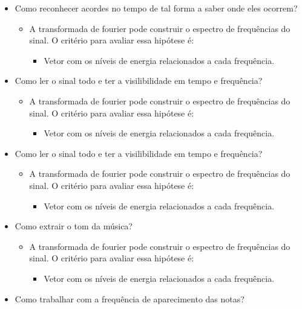 \begin{itemize}
	\item Como reconhecer acordes no tempo de tal forma a saber onde eles ocorrem?
	\begin{itemize}
		\item A transformada de fourier pode construir o espectro de frequências do sinal.
		O critério para avaliar essa hipótese é:
			\begin{itemize}
				\item Vetor com os níveis de energia relacionados a cada frequência.		
			\end{itemize}
	\end{itemize}
	\item Como ler o sinal todo e ter a visilibilidade em tempo e frequência?
	\begin{itemize}
		\item A transformada de fourier pode construir o espectro de frequências do sinal.
		O critério para avaliar essa hipótese é:
			\begin{itemize}
				\item Vetor com os níveis de energia relacionados a cada frequência.		
			\end{itemize}
	\end{itemize}
	\item Como ler o sinal todo e ter a visilibilidade em tempo e frequência?
	\begin{itemize}
		\item A transformada de fourier pode construir o espectro de frequências do sinal.
		O critério para avaliar essa hipótese é:
			\begin{itemize}
				\item Vetor com os níveis de energia relacionados a cada frequência.		
			\end{itemize}
	\end{itemize}
	\item Como extrair o tom da música?
	\begin{itemize}
		\item A transformada de fourier pode construir o espectro de frequências do sinal.
		O critério para avaliar essa hipótese é:
			\begin{itemize}
				\item Vetor com os níveis de energia relacionados a cada frequência.		
			\end{itemize}
	\end{itemize}
	\item Como trabalhar com a frequência de aparecimento das notas?
	\begin{itemize}

\end{itemize}
\end{itemize}
